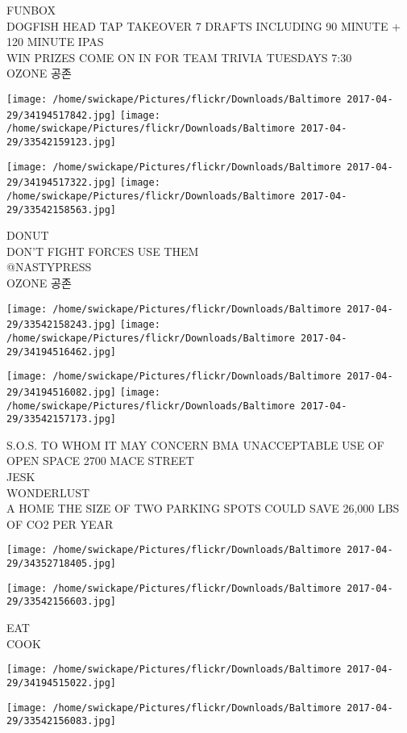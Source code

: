 \documentclass[10pt,letterpaper]{article}
\begin{document}
FUNBOX\\
DOGFISH HEAD TAP TAKEOVER 7 DRAFTS INCLUDING 90 MINUTE + 120 MINUTE IPAS\\
WIN PRIZES COME ON IN FOR TEAM TRIVIA TUESDAYS 7:30\\
OZONE 공존
\pagebreak

\texttt{[image: /home/swickape/Pictures/flickr/Downloads/Baltimore 2017-04-29/34194517842.jpg]}
\texttt{[image: /home/swickape/Pictures/flickr/Downloads/Baltimore 2017-04-29/33542159123.jpg]}

\texttt{[image: /home/swickape/Pictures/flickr/Downloads/Baltimore 2017-04-29/34194517322.jpg]}
\texttt{[image: /home/swickape/Pictures/flickr/Downloads/Baltimore 2017-04-29/33542158563.jpg]}

DONUT\\
DON'T FIGHT FORCES USE THEM\\
@NASTYPRESS\\
OZONE 공존
\pagebreak

\texttt{[image: /home/swickape/Pictures/flickr/Downloads/Baltimore 2017-04-29/33542158243.jpg]}
\texttt{[image: /home/swickape/Pictures/flickr/Downloads/Baltimore 2017-04-29/34194516462.jpg]}

\texttt{[image: /home/swickape/Pictures/flickr/Downloads/Baltimore 2017-04-29/34194516082.jpg]}
\texttt{[image: /home/swickape/Pictures/flickr/Downloads/Baltimore 2017-04-29/33542157173.jpg]}

S.O.S. TO WHOM IT MAY CONCERN BMA UNACCEPTABLE USE OF OPEN SPACE 2700 MACE STREET\\
JESK\\
WONDERLUST\\
A HOME THE SIZE OF TWO PARKING SPOTS COULD SAVE 26,000 LBS OF CO2 PER YEAR
\pagebreak

\texttt{[image: /home/swickape/Pictures/flickr/Downloads/Baltimore 2017-04-29/34352718405.jpg]}

\vspace{0.25in}
\texttt{[image: /home/swickape/Pictures/flickr/Downloads/Baltimore 2017-04-29/33542156603.jpg]}

EAT\\
COOK
\pagebreak

\texttt{[image: /home/swickape/Pictures/flickr/Downloads/Baltimore 2017-04-29/34194515022.jpg]}

\vspace{0.25in}
\texttt{[image: /home/swickape/Pictures/flickr/Downloads/Baltimore 2017-04-29/33542156083.jpg]}
\end{document}
